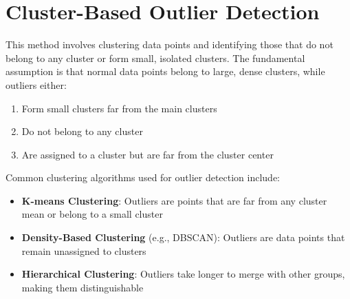 \documentclass[
  letterpaper,
  DIV=11,
  numbers=noendperiod]{scrreprt}
\providecommand{\tightlist}{%
  \setlength{\itemsep}{0pt}\setlength{\parskip}{0pt}}\usepackage{longtable,booktabs,array}
\begin{document}
\section{Cluster-Based Outlier
Detection}\label{cluster-based-outlier-detection}

This method involves clustering data points and identifying those that
do not belong to any cluster or form small, isolated clusters. The
fundamental assumption is that normal data points belong to large, dense
clusters, while outliers either:

\begin{enumerate}
\def\labelenumi{\arabic{enumi}.}
\tightlist
\item
  Form small clusters far from the main clusters
\item
  Do not belong to any cluster
\item
  Are assigned to a cluster but are far from the cluster center
\end{enumerate}

Common clustering algorithms used for outlier detection include:

\begin{itemize}
\tightlist
\item
  \textbf{K-means Clustering}: Outliers are points that are far from any
  cluster mean or belong to a small cluster
\item
  \textbf{Density-Based Clustering} (e.g., DBSCAN): Outliers are data
  points that remain unassigned to clusters
\item
  \textbf{Hierarchical Clustering}: Outliers take longer to merge with
  other groups, making them distinguishable
\end{itemize}
\end{document}
